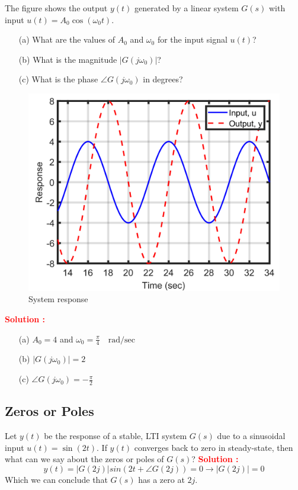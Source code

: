 \documentclass[12pt]{article}
\begin{document}
The figure shows the output \(y(t)\) generated by a linear system \(G(s)\) with input \(u(t) = A_0 \cos(\omega_0 t)\).
\begin{itemize}
    \item[(a)] What are the values of \(A_0\) and \(\omega_0\) for the input signal \(u(t)\)?
    \item[(b)] What is the magnitude \(|G(j\omega_0)|\)?
    \item[(c)] What is the phase \(\angle G(j\omega_0)\) in degrees?
\end{itemize}
\begin{figure}[h]
\centering
\includegraphics[width=0.7\linewidth]{figs/3.15.png}
\caption{System response}
\end{figure}
\textbf{\textcolor{red}{Solution :}}
\begin{itemize}
    \item[(a)] \(A_0 = 4\) and \(\omega_0 = \frac{\pi}{4} \quad \text{rad/sec}\)
    \item[(b)] \(|G(j\omega_0)| = 2\) 
    \item[(c)] \(\angle G(j\omega_0) = -\frac{\pi}{2}\)
\end{itemize}

\clearpage
\subsection{Zeros or Poles}

Let \(y(t)\) be the response of a stable, LTI system \(G(s)\) due to a sinusoidal input \(u(t) = \sin(2t)\). If \(y(t)\) converges back to zero in steady-state, then what can we say about the zeros or poles of \(G(s)\)?
\textbf{\textcolor{red}{Solution :}}
\[y(t) = |G(2j)|sin(2t+\angle G(2j)) = 0 \rightarrow |G(2j)| = 0\]
Which we can conclude that \(G(s)\) has a zero at \(2j\).
\end{document}
